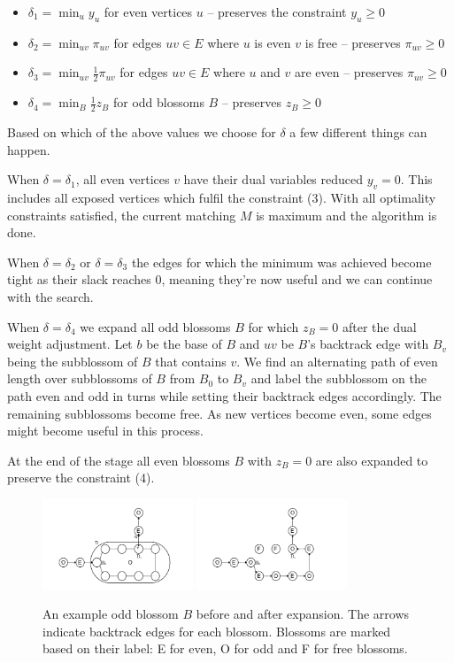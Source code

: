 \begin{itemize}
    \item $\delta_1 = \min_{u} y_u$ for even vertices $u$ – preserves the constraint $y_u \geq 0$
    \item $\delta_2 = \min_{uv} \pi_{uv}$ for edges $uv \in E$ where $u$ is even $v$ is free – preserves $\pi_{uv} \geq 0$
    \item $\delta_3 = \min_{uv} \frac{1}{2}\pi_{uv}$ for edges $uv \in E$ where $u$ and $v$ are even – preserves $\pi_{uv} \geq 0$
    \item $\delta_4 = \min_{B} \frac{1}{2} z_B$ for odd blossoms $B$ – preserves $z_B \geq 0$
\end{itemize}

Based on which of the above values we choose for $\delta$ a few different things can happen.

When $\delta = \delta_1$, all even vertices $v$ have their dual variables reduced $y_v = 0$. This includes all exposed vertices which fulfil the constraint (3). With all optimality constraints satisfied, the current matching $M$ is maximum and the algorithm is done.

When $\delta = \delta_2$ or $\delta = \delta_3$ the edges for which the minimum was achieved become tight as their slack reaches $0$, meaning they're now useful and we can continue with the search.

When $\delta = \delta_4$ we expand all odd blossoms $B$ for which $z_B = 0$ after the dual weight adjustment. Let $b$ be the base of $B$ and $uv$ be $B$'s backtrack edge with $B_v$ being the subblossom of $B$ that contains $v$. We find an alternating path of even length over subblossoms of $B$ from $B_0$ to $B_v$ and label the subblossom on the path even and odd in turns while setting their backtrack edges accordingly. The remaining subblossoms become free. As new vertices become even, some edges might become useful in this process.

At the end of the stage all even blossoms $B$ with $z_B = 0$ are also expanded to preserve the constraint (4).

\begin{figure}[t]
    \centering
    \includegraphics*[width=0.4\textwidth]{figures/Odd expansion.png}
    \includegraphics*[width=0.4\textwidth]{figures/Odd expanded.png}
    \caption{An example odd blossom $B$ before and after expansion. The arrows indicate backtrack edges for each blossom. Blossoms are marked based on their label: E for even, O for odd and F for free blossoms.}
\end{figure}

